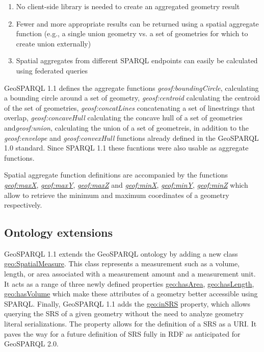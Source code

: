 \documentclass[runningheads]{llncs}
\begin{document}
\begin{enumerate}
    \item No client-side library is needed to create an aggregated geometry result
    \item Fewer and more appropriate results can be returned using a spatial aggregate function (e.g., a single union geometry vs. a set of geometries for which to create union externally)
    \item Spatial aggregates from different SPARQL endpoints can easily be calculated using federated queries 
\end{enumerate}

GeoSPARQL 1.1 defines the aggregate functions \emph{geosf:boundingCircle}, calculating a bounding circle around a set of 
geometry, \emph{geosf:centroid} calculating the centroid of the set of geometries, \emph{geosf:concatLines} concatenating 
a set of linestrings that overlap, \emph{geosf:concaveHull} calculating the concave hull of a set of geometries and\emph{geosf:union}, 
calculating the union of a set of geometreis, in addition to the \emph{geosf:envelope} and \emph{geosf:convexHull} functions 
already defined in the GeoSPARQL 1.0 standard. Since SPARQL 1.1 these fucntions were also usable as aggregate functions.

Spatial aggregate function definitions are accompanied by the functions \href{http://www.opengis.net/def/function/geosparql/maxX}{\emph{geof:maxX}}, 
\href{http://www.opengis.net/def/function/geosparql/maxY}{\emph{geof:maxY}}, \href{http://www.opengis.net/def/function/geosparql/maxZ}{\emph{geof:maxZ}} 
and \href{http://www.opengis.net/def/function/geosparql/minX}{\emph{geof:minX}}, \href{http://www.opengis.net/def/function/geosparql/minY}{\emph{geof:minY}}, 
\href{http://www.opengis.net/def/function/geosparql/minZ}{\emph{geof:minZ}} which allow to retrieve the minimum and maximum 
coordinates of a geometry respectively.

\subsection{Ontology extensions}\label{sec:ontexts}
GeoSPARQL 1.1 extends the GeoSPARQL ontology by adding a new class \href{http://www.opengis.net/ont/geosparql#SpatialMeasure}{geo:SpatialMeasure}. 
This class represents a measurement such as a volume, length, or area associated with a measurement amount and a measurement 
unit. It acts as a range of three newly defined properties \href{http://www.opengis.net/ont/geosparql#hasVolume}{geo:hasArea}, 
\href{http://www.opengis.net/ont/geosparql#hasLength}{geo:hasLength}, \href{http://www.opengis.net/ont/geosparql#hasVolume}{geo:hasVolume} 
which make these attributes of a geometry better accessible using SPARQL. Finally, GeoSPARQL 1.1 adds the 
\href{http://www.opengis.net/ont/geosparql#inSRS}{geo:inSRS} property, which allows querying the SRS of a given geometry 
without the need to analyze geometry literal serializations. The property allows for the definition of a SRS as a URI. It 
paves the way for a future definition of SRS fully in RDF as anticipated for GeoSPARQL 2.0.
\end{document}
